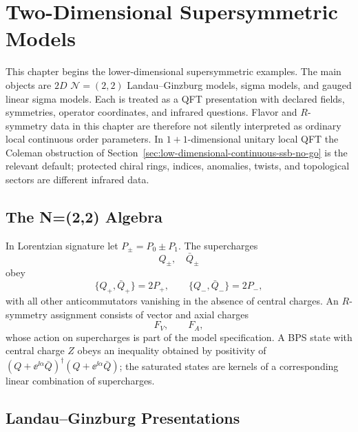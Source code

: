 \chapter{Two-Dimensional Supersymmetric Models}
\label{ch:susy-two-dimensional-lg_sigma_glsm}

\ConventionsMixed

This chapter begins the lower-dimensional supersymmetric examples.  The main
objects are \(2D\) \(\mathcal N=(2,2)\) Landau--Ginzburg models, sigma
models, and gauged linear sigma models.  Each is treated as a QFT presentation with
declared fields, symmetries, operator coordinates, and infrared questions.
Flavor and \(R\)-symmetry data in this chapter are therefore not silently
interpreted as ordinary local continuous order parameters.  In
\(1+1\)-dimensional unitary local QFT the Coleman obstruction of
Section~\ref{sec:low-dimensional-continuous-ssb-no-go} is the relevant
default; protected chiral rings, indices, anomalies, twists, and topological
sectors are different infrared data.

\section{The N=(2,2) Algebra}

In Lorentzian signature let \(P_\pm=P_0\pm P_1\).  The supercharges
\[
  Q_\pm,\quad \bar Q_\pm
\]
obey
\[
  \{Q_+,\bar Q_+\}=2P_+,\qquad
  \{Q_-,\bar Q_-\}=2P_-,
\]
with all other anticommutators vanishing in the absence of central charges.
An \(R\)-symmetry assignment consists of vector and axial charges
\[
  F_V,\qquad F_A,
\]
whose action on supercharges is part of the model specification.  A BPS state with
central charge \(Z\) obeys an inequality obtained by positivity of
\((Q+\ee^{\ii\alpha}\bar Q)^\dagger(Q+\ee^{\ii\alpha}\bar Q)\); the saturated
states are kernels of a corresponding linear combination of supercharges.

\section{Landau--Ginzburg Presentations}

